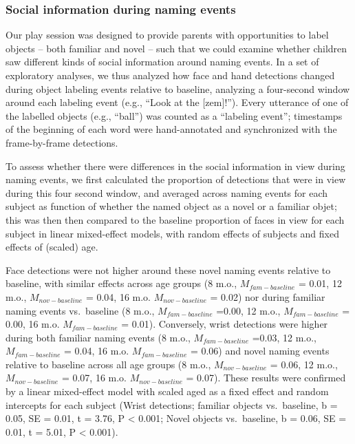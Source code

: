 \documentclass[english,man]{apa6}
\begin{document}
\subsubsection{Social information during naming
events}\label{social-information-during-naming-events}

Our play session was designed to provide parents with opportunities to
label objects -- both familiar and novel -- such that we could examine
whether children saw different kinds of social information around naming
events. In a set of exploratory analyses, we thus analyzed how face and
hand detections changed during object labeling events relative to
baseline, analyzing a four-second window around each labeling event
(e.g., \enquote{Look at the {[}zem{]}!}). Every utterance of one of the
labelled objects (e.g., \enquote{ball}) was counted as a
\enquote{labeling event}; timestamps of the beginning of each word were
hand-annotated and synchronized with the frame-by-frame detections.

To assess whether there were differences in the social information in
view during naming events, we first calculated the proportion of
detections that were in view during this four second window, and
averaged across naming events for each subject as function of whether
the named object as a novel or a familiar objet; this was then then
compared to the baseline proportion of faces in view for each subject in
linear mixed-effect models, with random effects of subjects and fixed
effects of (scaled) age.

Face detections were not higher around these novel naming events
relative to baseline, with similar effects across age groups (8 m.o.,
\(M_{fam - baseline}\) = 0.01, 12 m.o., \(M_{nov - baseline}\) = 0.04,
16 m.o. \(M_{nov - baseline}\) = 0.02) nor during familiar naming events
vs.~baseline (8 m.o., \(M_{fam - baseline}\) =0.00, 12 m.o.,
\(M_{fam - baseline}\) = 0.00, 16 m.o. \(M_{fam - baseline}\) = 0.01).
Conversely, wrist detections were higher during both familiar naming
events (8 m.o., \(M_{fam - baseline}\) =0.03, 12 m.o.,
\(M_{fam - baseline}\) = 0.04, 16 m.o. \(M_{fam - baseline}\) = 0.06)
and novel naming events relative to baseline across all age groups (8
m.o., \(M_{nov - baseline}\) = 0.06, 12 m.o., \(M_{nov - baseline}\) =
0.07, 16 m.o. \(M_{nov - baseline}\) = 0.07). These results were
confirmed by a linear mixed-effect model with scaled aged as a fixed
effect and random intercepts for each subject (Wrist detections;
familiar objects vs.~baseline, b = 0.05, SE = 0.01, t = 3.76, P
\textless{} 0.001; Novel objects vs.~baseline, b = 0.06, SE = 0.01, t =
5.01, P \textless{} 0.001).
\end{document}
